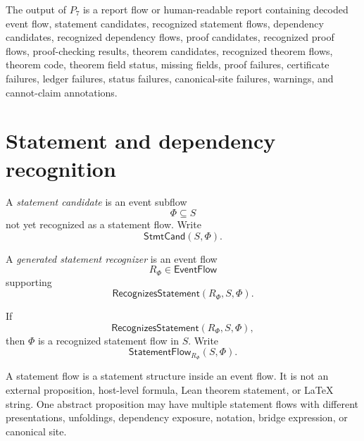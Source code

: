 \begin{definition}[$P_7$ output]
\label{def:theorem-proof-p7-output}
The output of $P_7$ is a report flow or human-readable report containing decoded event flow, statement candidates, recognized statement flows, dependency candidates, recognized dependency flows, proof candidates, recognized proof flows, proof-checking results, theorem candidates, recognized theorem flows, theorem code, theorem field status, missing fields, proof failures, certificate failures, ledger failures, status failures, canonical-site failures, warnings, and cannot-claim annotations.
\end{definition}

\section{Statement and dependency recognition}
\label{sec:theorem-proof-statement-dependencies}

\begin{definition}
\label{def:theorem-proof-statement-candidate}
A \emph{statement candidate} is an event subflow
$$
  \Phi\subseteq S
$$
not yet recognized as a statement flow. Write
$$
  \mathsf{StmtCand}(S,\Phi).
$$
\end{definition}

\begin{definition}
\label{def:theorem-proof-generated-statement-recognizer}
A \emph{generated statement recognizer} is an event flow
$$
  R_{\Phi}\in\mathsf{EventFlow}
$$
supporting
$$
  \mathsf{RecognizesStatement}(R_{\Phi},S,\Phi).
$$
\end{definition}

\begin{definition}
\label{def:theorem-proof-recognized-statement-flow}
If
$$
  \mathsf{RecognizesStatement}(R_{\Phi},S,\Phi),
$$
then $\Phi$ is a recognized statement flow in $S$. Write
$$
  \mathsf{StatementFlow}_{R_{\Phi}}(S,\Phi).
$$
\end{definition}

\begin{remark}
\label{rem:theorem-proof-statement-not-proposition}
A statement flow is a statement structure inside an event flow. It is not an external proposition, host-level formula, Lean theorem statement, or LaTeX string. One abstract proposition may have multiple statement flows with different presentations, unfoldings, dependency exposure, notation, bridge expression, or canonical site.
\end{remark}

